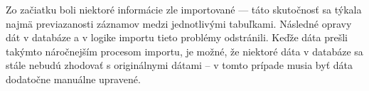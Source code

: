  Zo začiatku boli niektoré informácie zle importované --- táto skutočnosť sa týkala najmä previazanosti záznamov medzi jednotlivými tabuľkami. Následné opravy dát v databáze a v logike importu tieto problémy odstránili. Keďže dáta prešli takýmto náročnejším procesom importu, je možné, že niektoré dáta v databáze sa stále nebudú zhodovať s originálnymi dátami -- v tomto prípade musia byť dáta dodatočne manuálne upravené.

